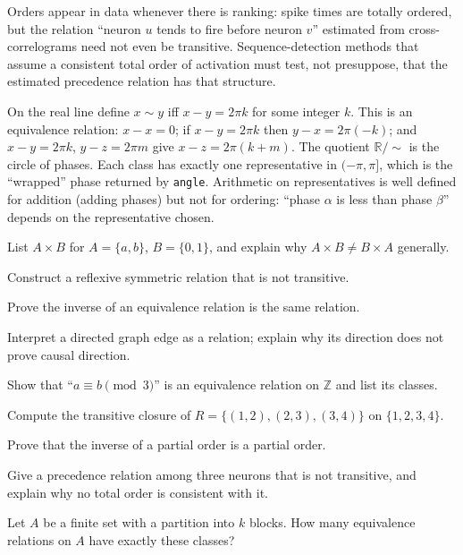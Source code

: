 Orders appear in data whenever there is ranking: spike times are totally ordered, but the relation ``neuron $u$ tends to fire before neuron $v$'' estimated from cross-correlograms need not even be transitive. Sequence-detection methods that assume a consistent total order of activation must test, not presuppose, that the estimated precedence relation has that structure.

\begin{workedexample}
On the real line define $x\sim y$ iff $x-y=2\pi k$ for some integer $k$. This is an equivalence relation: $x-x=0$; if $x-y=2\pi k$ then $y-x=2\pi(-k)$; and $x-y=2\pi k$, $y-z=2\pi m$ give $x-z=2\pi(k+m)$. The quotient $\mathbb R/{\sim}$ is the circle of phases. Each class has exactly one representative in $(-\pi,\pi]$, which is the ``wrapped'' phase returned by \texttt{angle}. Arithmetic on representatives is well defined for addition (adding phases) but not for ordering: ``phase $\alpha$ is less than phase $\beta$'' depends on the representative chosen.
\end{workedexample}
\begin{exercises}
\item List $A\times B$ for $A=\{a,b\}$, $B=\{0,1\}$, and explain why $A\times B\ne B\times A$ generally.
\item Construct a reflexive symmetric relation that is not transitive.
\item Prove the inverse of an equivalence relation is the same relation.
\item Interpret a directed graph edge as a relation; explain why its direction does not prove causal direction.
\item Show that ``$a\equiv b \pmod 3$'' is an equivalence relation on $\mathbb Z$ and list its classes.
\item Compute the transitive closure of $R=\{(1,2),(2,3),(3,4)\}$ on $\{1,2,3,4\}$.
\item Prove that the inverse of a partial order is a partial order.
\item Give a precedence relation among three neurons that is not transitive, and explain why no total order is consistent with it.
\item Let $A$ be a finite set with a partition into $k$ blocks. How many equivalence relations on $A$ have exactly these classes?
\end{exercises}
